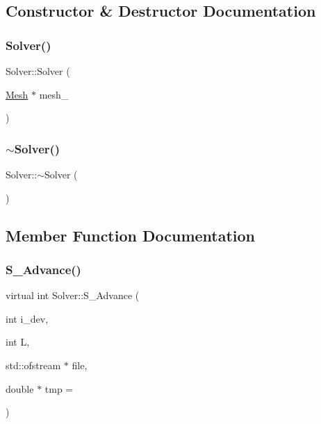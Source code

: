 \subsection{Constructor \& Destructor Documentation}
\mbox{\label{classSolver_a2608849f7c7dc3ec3e0c7b24e00712cf}} 
\subsubsection{\texorpdfstring{Solver()}{Solver()}}
{\footnotesize\ttfamily Solver\+::\+Solver (\begin{DoxyParamCaption}\item[{\hyperlink{classMesh}{Mesh} $\ast$}]{mesh\+\_\+ }\end{DoxyParamCaption})\hspace{0.3cm}{\ttfamily [inline]}}

\mbox{\label{classSolver_aba52d3c92fafceb6fe39f937f2d73db3}} 
\subsubsection{\texorpdfstring{$\sim$\+Solver()}{~Solver()}}
{\footnotesize\ttfamily Solver\+::$\sim$\+Solver (\begin{DoxyParamCaption}{ }\end{DoxyParamCaption})\hspace{0.3cm}{\ttfamily [inline]}}



\subsection{Member Function Documentation}
\mbox{\label{classSolver_a4bbad207af5ea842a472a35049d4fbb9}} 
\subsubsection{\texorpdfstring{S\+\_\+\+Advance()}{S\_Advance()}}
{\footnotesize\ttfamily virtual int Solver\+::\+S\+\_\+\+Advance (\begin{DoxyParamCaption}\item[{int}]{i\+\_\+dev,  }\item[{int}]{L,  }\item[{std\+::ofstream $\ast$}]{file,  }\item[{double $\ast$}]{tmp = {} }\end{DoxyParamCaption})\hspace{0.3cm}{\ttfamily [pure virtual]}}



